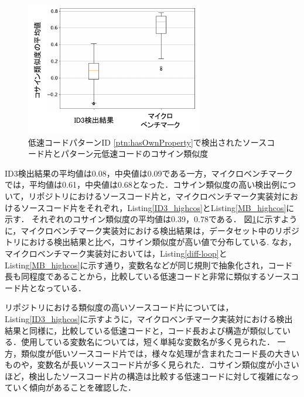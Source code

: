 \documentclass[submit,techrep,noauthor]{ipsj}
\begin{document}
\begin{figure}[t]
    \centering
    \includegraphics[width=0.85\linewidth]{./Noguchi_fig/boxplot_compare.pdf}
    \caption{低速コードパターンID \ref{ptn:hasOwnProperty}で検出されたソースコード片とパターン元低速コードのコサイン類似度}
    \label{fig:boxplot_cosine}
\end{figure}

ID3検出結果の平均値は0.08，中央値は0.09である一方，マイクロベンチマークでは，平均値は0.61，中央値は0.68となった．コサイン類似度の高い検出例について，リポジトリにおけるソースコード片と，マイクロベンチマーク実装対におけるソースコード片をそれぞれ，Listing\ref{ID3_highcos}とListing\ref{MB_highcos}に示す．
それぞれのコサイン類似度の平均値は0.39，0.78である．
図\ref{fig:boxplot_cosine}に示すように，マイクロベンチマーク実装対における検出結果は，データセット中のリポジトリにおける検出結果と比べ，コサイン類似度が高い値で分布している.
なお，マイクロベンチマーク実装対においては，Listing\ref{diff-loop}とListing\ref{MB_highcos}に示す通り，変数名などが同じ規則で抽象化され，コード長も同程度であることから，比較している低速コードと非常に類似するソースコード片となっている．

リポジトリにおける類似度の高いソースコード片については，Listing\ref{ID3_highcos}に示すように，マイクロベンチマーク実装対における検出結果と同様に，比較している低速コードと，コード長および構造が類似している．使用している変数名については，短く単純な変数名が多く見られた．
一方，類似度が低いソースコード片では，様々な処理が含まれたコード長の大きいものや，変数名が長いソースコード片が多く見られた．コサイン類似度が小さいほど，検出したソースコード片の構造は比較する低速コードに対して複雑になっていく傾向があることを確認した．
\end{document}
